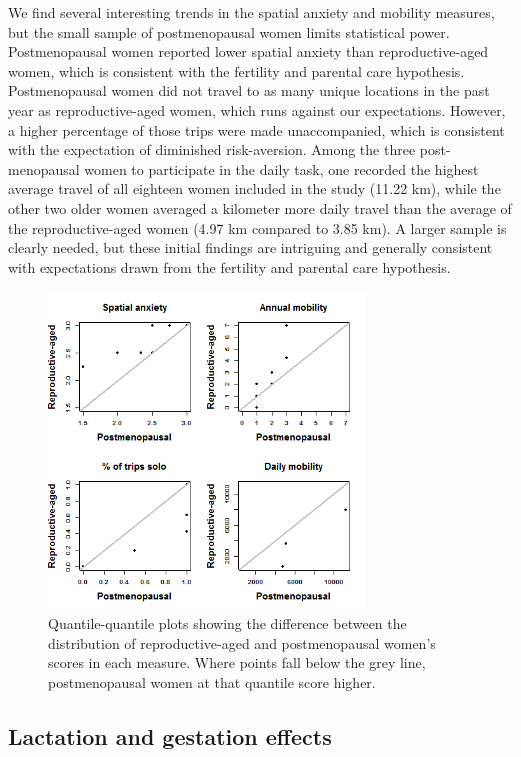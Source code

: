 We find several interesting trends in the spatial anxiety and mobility measures, but the small sample of postmenopausal women limits statistical power.  Postmenopausal women reported lower spatial anxiety than reproductive-aged women, which is consistent with the fertility and parental care hypothesis.  Postmenopausal women did not travel to as many unique locations in the past year as reproductive-aged women, which runs against our expectations.  However, a higher percentage of those trips were made unaccompanied, which is consistent with the expectation of diminished risk-aversion.  Among the three post-menopausal women to participate in the daily task, one recorded the highest average travel of all eighteen women included in the study (11.22 km), while the other two older women averaged a kilometer more daily travel than the average of the reproductive-aged women (4.97 km compared to 3.85 km).  A larger sample is clearly needed, but these initial findings are intriguing and generally consistent with expectations drawn from the fertility and parental care hypothesis.

\begin{figure}[!htb]
  \includegraphics[width=0.75\textwidth]{QQ_pst}
\caption{Quantile-quantile plots showing the difference between the distribution of reproductive-aged and postmenopausal women's scores in each measure. Where points fall below the grey line, postmenopausal women at that quantile score higher.}
\label{fig:meno}       %
\end{figure}


	\subsection{Lactation and gestation effects}
	\label{sec:3.3}
	
